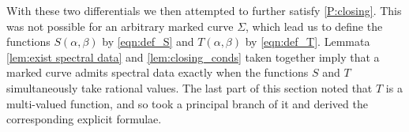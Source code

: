 With these two differentials we then attempted to further satisfy \ref{P:closing}. This was not possible for an arbitrary marked curve $Σ$, which lead us to define the functions $S(α,β)$ by \eqref{eqn:def_S} and $T(α,β)$ by \eqref{eqn:def_T}. Lemmata \ref{lem:exist spectral data} and \ref{lem:closing_conds} taken together imply that a marked curve admits spectral data exactly when the functions $S$ and $T$ simultaneously take rational values. The last part of this section noted that $T$ is a multi-valued function, and so took a principal branch of it and derived the corresponding explicit formulae.

%
%









